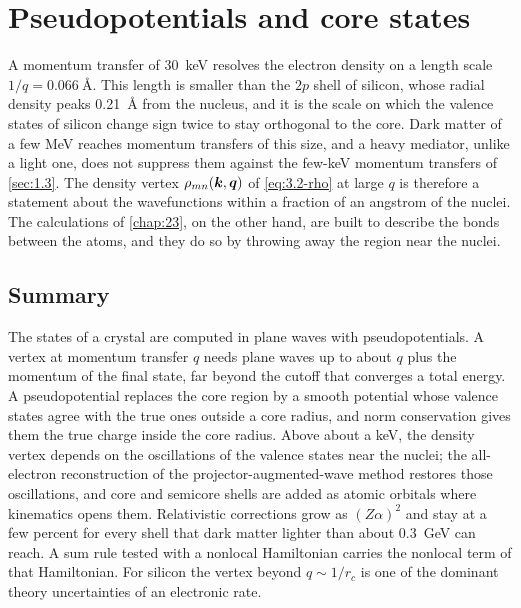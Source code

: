 \chapter{Pseudopotentials and core states}\label{chap:24}

A momentum transfer of \SI{30}{keV} resolves the electron density on a length scale $1/q = \SI{0.066}{\angstrom}$. This length is smaller than the $2p$ shell of silicon, whose radial density peaks \SI{0.21}{\angstrom} from the nucleus, and it is the scale on which the valence states of silicon change sign twice to stay orthogonal to the core. Dark matter of a few MeV reaches momentum transfers of this size, and a heavy mediator, unlike a light one, does not suppress them against the few-keV momentum transfers of \cref{sec:1.3}. The density vertex $\rho_{mn}(\bm{k}, \bm{q})$ of \cref{eq:3.2-rho} at large $q$ is therefore a statement about the wavefunctions within a fraction of an angstrom of the nuclei. The calculations of \cref{chap:23}, on the other hand, are built to describe the bonds between the atoms, and they do so by throwing away the region near the nuclei.




\section*{Summary}

The states of a crystal are computed in plane waves with pseudopotentials. A vertex at momentum transfer $q$ needs plane waves up to about $q$ plus the momentum of the final state, far beyond the cutoff that converges a total energy. A pseudopotential replaces the core region by a smooth potential whose valence states agree with the true ones outside a core radius, and norm conservation gives them the true charge inside the core radius. Above about a keV, the density vertex depends on the oscillations of the valence states near the nuclei; the all-electron reconstruction of the projector-augmented-wave method restores those oscillations, and core and semicore shells are added as atomic orbitals where kinematics opens them. Relativistic corrections grow as $(Z\alpha)^2$ and stay at a few percent for every shell that dark matter lighter than about \SI{0.3}{GeV} can reach. A sum rule tested with a nonlocal Hamiltonian carries the nonlocal term of that Hamiltonian. For silicon the vertex beyond $q \sim 1/r_c$ is one of the dominant theory uncertainties of an electronic rate.

\printbibliography[heading=subbibliography]
